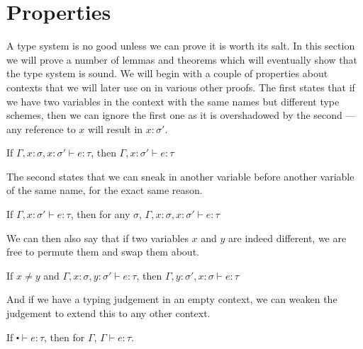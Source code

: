 \chapter{Properties}\label{cha:properties}
A type system is no good unless we can prove it is worth its salt. In
this section we will prove a number of lemmas and theorems which will
eventually show that the type system is sound. We will begin with a
couple of properties about contexts that we will later use on in
various other proofs. The first states that if we have two variables
in the context with the same names but different type schemes, then we
can ignore the first one as it is overshadowed by the second --- any
reference to $x$ will result in $x : \sigma'$.
\begin{lemma}[Drop]\label{lem:drop}
  If $\Gamma , x : \sigma, x : \sigma' \vdash e : \tau$, then $\Gamma , x : \sigma' \vdash e : \tau$
\end{lemma}
The second states that we can sneak in another variable before another
variable of the same name, for the exact same reason.
\begin{lemma}[Sneak]\label{lem:sneak}
  If $\Gamma , x : \sigma' \vdash e : \tau$, then for any $\sigma$, $\Gamma , x : \sigma, x : \sigma' \vdash e : \tau$
\end{lemma}
We can then also say that if two variables $x$ and $y$ are indeed
different, we are free to permute them and swap them about.
\begin{lemma}[Swap]\label{lem:swap}
  If $x \neq y$ and $\Gamma , x : \sigma, y : \sigma' \vdash e : \tau$, then $\Gamma , y : \sigma' , x : \sigma \vdash e
  : \tau$
\end{lemma}
And if we have a typing judgement in an empty context, we can weaken
the judgement to extend this to any other context.
\begin{lemma}[Weaken]\label{lem:weaken}
  If $\centerdot \vdash e : \tau$, then for $\Gamma$, $\Gamma \vdash e : \tau$.
\end{lemma}

